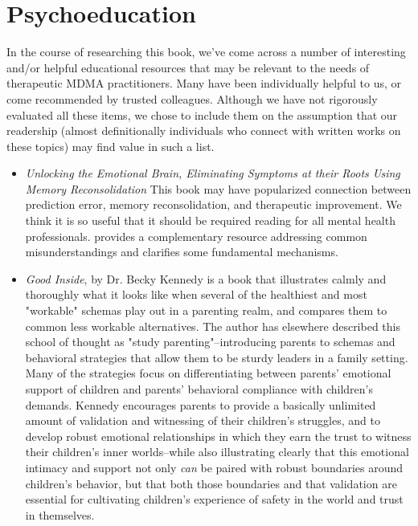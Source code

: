 \documentclass[12pt,letterpaper]{book}
\begin{document}
\chapter{Psychoeducation}
\label{sec:psychoeducation}
In the course of researching this book, we've come across a number of interesting and/or helpful educational resources that may be relevant to the needs of therapeutic MDMA practitioners. Many have been individually helpful to us, or come recommended by trusted colleagues. Although we have not rigorously evaluated all these items, we chose to include them on the assumption that our readership (almost definitionally individuals who connect with written works on these topics) may find value in such a list.
\label{resources}
\begin{itemize}
    \item \textit{Unlocking the Emotional Brain, Eliminating Symptoms at their Roots Using Memory Reconsolidation} This book may have popularized connection between prediction error, memory reconsolidation, and therapeutic improvement. We think it is so useful that it should be required reading for all mental health professionals. \textcite{ecker2015misunderstood} provides a complementary resource addressing common misunderstandings and clarifies some fundamental mechanisms.
    \item \textit{Good Inside}, by Dr. Becky Kennedy \cite{kennedy2022good} is a book that illustrates calmly and thoroughly what it looks like when several of the healthiest and most "workable" schemas play out in a parenting realm, and compares them to common less workable alternatives. The author has elsewhere described this school of thought as "study parenting"–introducing parents to schemas and behavioral strategies that allow them to be sturdy leaders in a family setting. Many of the strategies focus on differentiating between parents' emotional support of children and parents' behavioral compliance with children's demands. Kennedy encourages parents to provide a basically unlimited amount of validation and witnessing of their children's struggles, and to develop robust emotional relationships in which they earn the trust to witness their children's inner worlds–while also illustrating clearly that this emotional intimacy and support not only \textit{can} be paired with robust boundaries around children's behavior, but that both those boundaries and that validation are essential for cultivating children's experience of safety in the world and trust in themselves. 


\end{itemize}
\end{document}
